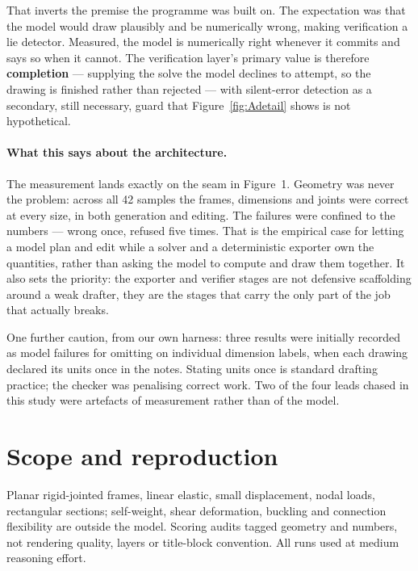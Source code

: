 \documentclass[11pt,a4paper]{article}
\DeclareRobustCommand{\code}[1]{\texttt{\detokenize{#1}}}
\begin{document}
That inverts the premise the programme was built on. The expectation was that the model would draw
plausibly and be numerically wrong, making verification a lie detector. Measured, the model is
numerically right whenever it commits and says so when it cannot. The verification layer's primary
value is therefore \textbf{completion} --- supplying the solve the model declines to attempt, so the
drawing is finished rather than rejected --- with silent-error detection as a secondary, still
necessary, guard that Figure~\ref{fig:Adetail} shows is not hypothetical.

\paragraph{What this says about the architecture.} The measurement lands exactly on the seam in
Figure~1. Geometry was never the problem: across all 42 samples the frames, dimensions and joints were
correct at every size, in both generation and editing. The failures were confined to the numbers ---
wrong once, refused five times. That is the empirical case for letting a model plan and edit while a
solver and a deterministic exporter own the quantities, rather than asking the model to compute and
draw them together. It also sets the priority: the exporter and verifier stages are not defensive
scaffolding around a weak drafter, they are the stages that carry the only part of the job that
actually breaks.

One further caution, from our own harness: three results were initially recorded as model failures for
omitting \code{mm} on individual dimension labels, when each drawing declared its units once in the
notes. Stating units once is standard drafting practice; the checker was penalising correct work. Two
of the four leads chased in this study were artefacts of measurement rather than of the model.

\section{Scope and reproduction}

Planar rigid-jointed frames, linear elastic, small displacement, nodal loads,
rectangular sections; self-weight, shear deformation, buckling and connection flexibility are outside
the model. Scoring audits tagged geometry and numbers, not rendering quality, layers or title-block
convention. All runs used \code{gpt-6-astra} at medium reasoning effort.
\end{document}
